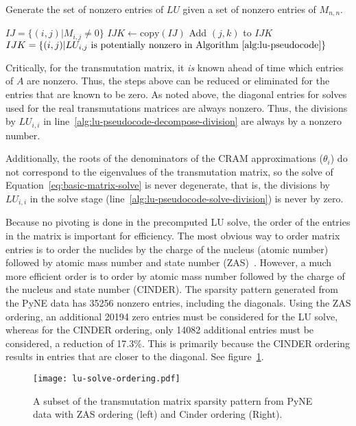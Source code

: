 \begin{algorithm}[h]
  \caption{Generate the set of nonzero entries of $LU$ given a set of nonzero
    entries of $M_{n,n}$.}\label{alg:make-ijk}
  \begin{algorithmic}[1]
  \REQUIRE $IJ=\{(i, j) | M_{i, j} \neq 0\}$
  \STATE $IJK \leftarrow \mathrm{copy}(IJ)$
  \STATE
              \CONTINUE
          \ENDIF
          \STATE
                   \STATE Add $(j, k)$ to $IJK$
               \ENDIF
          \ENDFOR
      \ENDFOR
  \ENDFOR
  \ENSURE $IJK=\{(i,j)|LU_{i,j}\mathrm{\ is\ potentially\ nonzero\ in\ Algorithm~\ref{alg:lu-pseudocode}}\}$
\end{algorithmic}
\end{algorithm}

Critically, for the transmutation matrix, it \textit{is} known ahead of time
which entries of $A$ are nonzero. Thus, the steps above can be reduced or
eliminated for the entries that are known to be zero. As noted above, the
diagonal entries for solves used for the real transmutations matrices are
always nonzero. Thus, the divisions by $LU_{i,i}$ in
line~\ref{alg:lu-pseudocode-decompose-division} are always by a nonzero
number.

Additionally, the roots of the denominators of the CRAM approximations
($\theta_i$) do not correspond to the eigenvalues of the transmutation matrix,
so the solve of Equation~\ref{eq:basic-matrix-solve} is never degenerate, that
is, the divisions by $LU_{i,i}$ in the solve stage
(line~\ref{alg:lu-pseudocode-solve-division}) is never by zero.

Because no pivoting is done in the precomputed LU solve, the order of the
entries in the matrix is important for efficiency. The most obvious way to
order matrix entries is to order the nuclides by the charge of the nucleus
(atomic number) followed by atomic mass number and state number
(ZAS)~\cite{ationneeded}. However, a much more efficient order is to order by
atomic mass number followed by the charge of the nucleus and state number
(CINDER). The sparsity pattern generated from the PyNE data has 35256
nonzero entries, including the diagonals. Using the ZAS ordering, an
additional 20194 zero entries must be considered for the LU solve, whereas for
the CINDER ordering, only 14082 additional entries must be considered, a
reduction of 17.3\%. This is primarily because the CINDER ordering results in
entries that are closer to the diagonal. See figure~\ref{fig:lu-solve-ordering}.

\begin{figure}[!ht]
\centering
\texttt{[image: lu-solve-ordering.pdf]}
\caption{A subset of the transmutation matrix sparsity pattern from PyNE data
  with ZAS ordering (left) and Cinder ordering (Right).}
\label{fig:lu-solve-ordering}
\end{figure}
